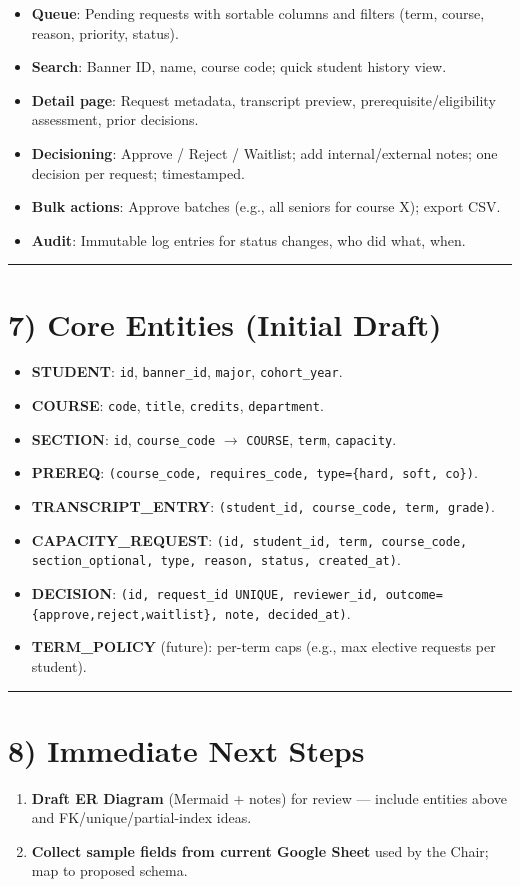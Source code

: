 \documentclass[12pt,a4paper]{article}
\begin{document}
\begin{itemize}
  \item \textbf{Queue}: Pending requests with sortable columns and filters (term, course, reason, priority, status).
  \item \textbf{Search}: Banner ID, name, course code; quick student history view.
  \item \textbf{Detail page}: Request metadata, transcript preview, prerequisite/eligibility assessment, prior decisions.
  \item \textbf{Decisioning}: Approve / Reject / Waitlist; add internal/external notes; one decision per request; timestamped.
  \item \textbf{Bulk actions}: Approve batches (e.g., all seniors for course X); export CSV.
  \item \textbf{Audit}: Immutable log entries for status changes, who did what, when.
\end{itemize}

\hrule

\section*{7) Core Entities (Initial Draft)}

\begin{itemize}
  \item \textbf{STUDENT}: \texttt{id}, \texttt{banner\_id}, \texttt{major}, \texttt{cohort\_year}.
  \item \textbf{COURSE}: \texttt{code}, \texttt{title}, \texttt{credits}, \texttt{department}.
  \item \textbf{SECTION}: \texttt{id}, \texttt{course\_code} $\rightarrow$ \texttt{COURSE}, \texttt{term}, \texttt{capacity}.
  \item \textbf{PREREQ}: \texttt{(course\_code, requires\_code, type=\{hard, soft, co\})}.
  \item \textbf{TRANSCRIPT\_ENTRY}: \texttt{(student\_id, course\_code, term, grade)}.
  \item \textbf{CAPACITY\_REQUEST}: \texttt{(id, student\_id, term, course\_code, section\_optional, type, reason, status, created\_at)}.
  \item \textbf{DECISION}: \texttt{(id, request\_id UNIQUE, reviewer\_id, outcome=\{approve,reject,waitlist\}, note, decided\_at)}.
  \item \textbf{TERM\_POLICY} (future): per-term caps (e.g., max elective requests per student).
\end{itemize}

\hrule

\section*{8) Immediate Next Steps}

\begin{enumerate}
  \item \textbf{Draft ER Diagram} (Mermaid + notes) for review --- include entities above and FK/unique/partial-index ideas.
  \item \textbf{Collect sample fields from current Google Sheet} used by the Chair; map to proposed schema.
\end{enumerate}
\end{document}
